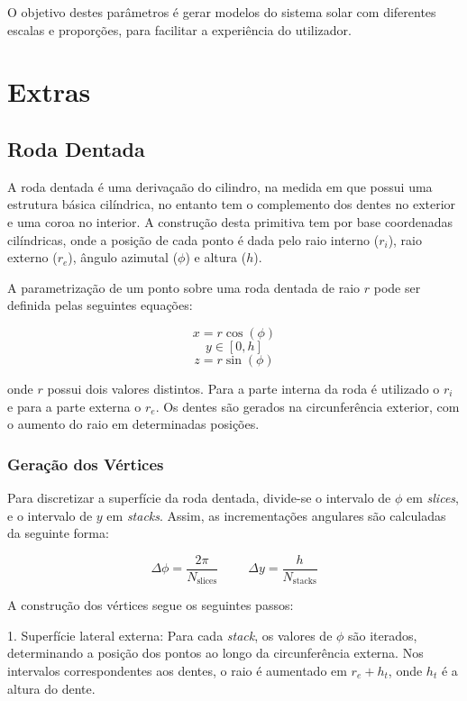 \documentclass[12pt, a4paper]{article}
\begin{document}
O objetivo destes parâmetros é gerar modelos do sistema solar com diferentes escalas e
proporções, para facilitar a experiência do utilizador.

\section{Extras}

\subsection{Roda Dentada}

A roda dentada é uma derivaçaão do cilindro, na medida em que possui uma estrutura básica
cilíndrica, no entanto tem o complemento dos dentes no exterior e uma coroa no interior. A
construção desta primitiva tem por base coordenadas cilíndricas, onde a posição de cada ponto é
dada pelo raio interno ($r_i$), raio externo ($r_e$), ângulo azimutal ($\phi$) e altura ($h$).

A parametrização de um ponto sobre uma roda dentada de raio \( r \) pode ser definida
pelas seguintes equações:

$$x = r \cos(\phi)$$
$$y \in \left [ 0, h \right ]$$
$$z =  r \sin(\phi)$$


onde $r$ possui dois valores distintos. Para a parte interna da roda é utilizado o $r_i$ e para a
parte externa o $r_e$. Os dentes são gerados na circunferência exterior, com o aumento do raio em
determinadas posições.

\subsubsection{Geração dos Vértices}

Para discretizar a superfície da roda dentada, divide-se o intervalo de $\phi$ em \emph{slices}, e
o intervalo de $y$ em \emph{stacks}. Assim, as incrementações angulares são calculadas da seguinte
forma:

$$
\Delta \phi = \frac{2\pi}{N_\text{slices}}
\hspace{1cm}
\Delta y = \frac{h}{N_\text{stacks}}
$$

A construção dos vértices segue os seguintes passos:

1. Superfície lateral externa: Para cada \emph{stack}, os valores de $\phi$ são iterados,
determinando a posição dos pontos ao longo da circunferência externa. Nos intervalos correspondentes
aos dentes, o raio é aumentado em $r_e + h_t$, onde $h_t$ é a altura do dente.
\end{document}

